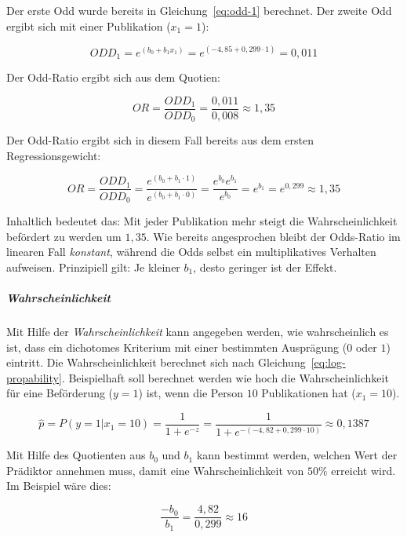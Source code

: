 \documentclass{article}
\numberwithin{equation}{section}
\begin{document}
Der erste Odd wurde bereits in Gleichung~\ref{eq:odd-1} berechnet. Der zweite Odd ergibt sich mit einer Publikation ($x_1 = 1$):

\begin{equation}
ODD_1 = e^{(b_0 + b_1 x_1)} = e^{(-4,85 + 0,299 \cdot 1)} = 0,011
\end{equation}

Der Odd-Ratio ergibt sich aus dem Quotien:

\begin{equation}
OR = \frac{ODD_1}{ODD_0} = \frac{0,011}{0,008} \approx 1,35
\end{equation}

Der Odd-Ratio ergibt sich in diesem Fall bereits aus dem ersten Regressionsgewicht:

\begin{equation}
OR = \frac{ODD_1}{ODD_0} = \frac{e^{(b_0 + b_1 \cdot 1)}}{e^{(b_0 + b_1 \cdot 0)}} = \frac{e^{b_0} e^{b_1}}{e^{b_0}} = e^{b_1} = e^{0,299} \approx 1,35
\end{equation}

Inhaltlich bedeutet das: Mit jeder Publikation mehr steigt die Wahrscheinlichkeit befördert zu werden um $1,35$. Wie bereits angesprochen bleibt der Odds-Ratio im linearen Fall \emph{konstant}, während die Odds selbst ein multiplikatives Verhalten aufweisen. Prinzipiell gilt: Je kleiner $b_1$, desto geringer ist der Effekt.

\subparagraph{Wahrscheinlichkeit}

Mit Hilfe der \emph{Wahrscheinlichkeit} kann angegeben werden, wie wahrscheinlich es ist, dass ein dichotomes Kriterium mit einer bestimmten Ausprägung ($0$ oder $1$) eintritt. Die Wahrscheinlichkeit berechnet sich nach Gleichung~\ref{eq:log-propability}. Beispielhaft soll berechnet werden wie hoch die Wahrscheinlichkeit für eine Beförderung ($y=1$) ist, wenn die Person $10$ Publikationen hat ($x_1 = 10$).

\begin{equation}
\hat p = P(y = 1 | x_1 = 10) = \frac{1}{1+e^{-z}} = \frac{1}{1+e^{-(-4,82 + 0,299 \cdot 10)}} \approx 0,1387
\end{equation}

Mit Hilfe des Quotienten aus $b_0$ und $b_1$ kann bestimmt werden, welchen Wert der Prädiktor annehmen muss, damit eine Wahrscheinlichkeit von $50\%$ erreicht wird. Im Beispiel wäre dies:

\begin{equation}
\frac{-b_0}{b_1} = \frac{4,82}{0,299} \approx 16
\end{equation}
\end{document}

